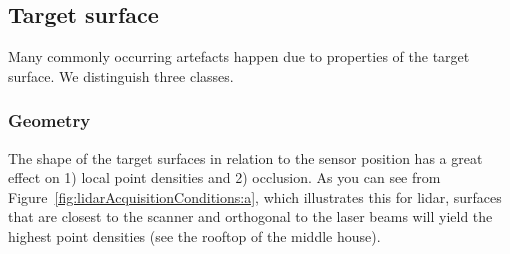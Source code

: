 \subsection{Target surface}
Many commonly occurring  artefacts  happen due to properties of the target surface. We distinguish three classes.

\subsubsection{Geometry} 
The shape of the target surfaces in relation to the sensor position has a great effect on 1) local point densities and 2) occlusion. 
As you can see from Figure~\ref{fig:lidarAcquisitionConditions:a}, which illustrates this for lidar, surfaces that are closest to the scanner and orthogonal to the laser beams will yield the highest point densities (see the rooftop of the middle house). 
